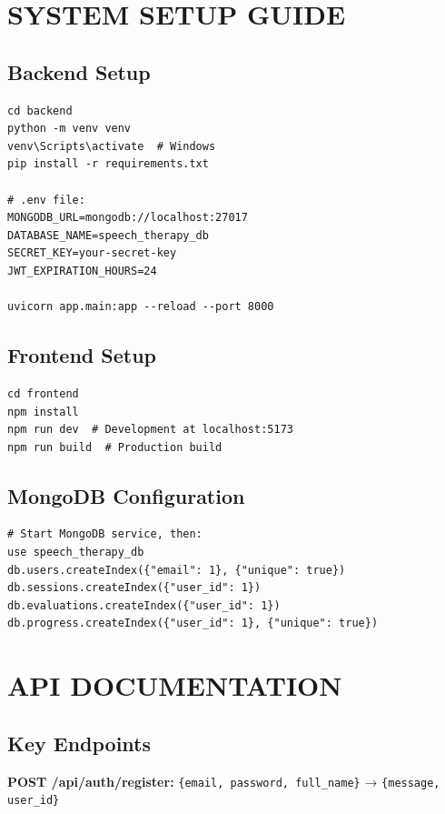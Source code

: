 \documentclass[12pt,a4paper]{article}
\begin{document}
\appendix

\section{SYSTEM SETUP GUIDE}

\subsection{Backend Setup}

\begin{verbatim}
cd backend
python -m venv venv
venv\Scripts\activate  # Windows
pip install -r requirements.txt

# .env file:
MONGODB_URL=mongodb://localhost:27017
DATABASE_NAME=speech_therapy_db
SECRET_KEY=your-secret-key
JWT_EXPIRATION_HOURS=24

uvicorn app.main:app --reload --port 8000
\end{verbatim}

\subsection{Frontend Setup}

\begin{verbatim}
cd frontend
npm install
npm run dev  # Development at localhost:5173
npm run build  # Production build
\end{verbatim}

\subsection{MongoDB Configuration}

\begin{verbatim}
# Start MongoDB service, then:
use speech_therapy_db
db.users.createIndex({"email": 1}, {"unique": true})
db.sessions.createIndex({"user_id": 1})
db.evaluations.createIndex({"user_id": 1})
db.progress.createIndex({"user_id": 1}, {"unique": true})
\end{verbatim}

\section{API DOCUMENTATION}

\subsection{Key Endpoints}

\textbf{POST /api/auth/register:} \texttt{\{email, password, full\_name\}} → \texttt{\{message, user\_id\}}
\end{document}
